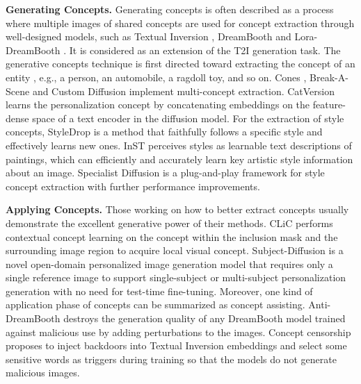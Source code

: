 \textbf{Generating Concepts.} Generating concepts is often described as a process where multiple images of shared concepts are used for concept extraction through well-designed models, such as Textual Inversion \cite{gal2022image}, DreamBooth \cite{Ruiz_2023_CVPR} and Lora-DreamBooth \cite{hu2022lora}. It is considered as an extension of the T2I generation task. The generative concepts technique is first directed toward extracting the concept of an entity \cite{10.1145/3618315}, e.g., a person, an automobile, a ragdoll toy, and so on. Cones \cite{liu2023cones, liu2023cones2}, Break-A-Scene \cite{Avrahami2023Break} and Custom Diffusion \cite{Kumari_2023_CVPR} implement multi-concept extraction. CatVersion \cite{zhao2023catversion} learns the personalization concept by concatenating embeddings on the feature-dense space of a text encoder in the diffusion model. For the extraction of style concepts, StyleDrop \cite{NEURIPS2023_d33b177b} is a method that faithfully follows a specific style and effectively learns new ones. InST \cite{Zhang_2023_CVPR} perceives styles as learnable text descriptions of paintings, which can efficiently and accurately learn key artistic style information about an image. Specialist Diffusion \cite{Lu_2023_CVPR} is a plug-and-play framework for style concept extraction with further performance improvements.

\textbf{Applying Concepts.} Those working on how to better extract concepts usually demonstrate the excellent generative power of their methods. CLiC \cite{safaee2023clic} performs contextual concept learning on the concept within the inclusion mask and the surrounding image region to acquire local visual concept. Subject-Diffusion \cite{ma2023subject} is a novel open-domain personalized image generation model that requires only a single reference image to support single-subject or multi-subject personalization generation with no need for test-time fine-tuning. Moreover, one kind of application phase of concepts can be summarized as concept assisting. Anti-DreamBooth \cite{Van_Le_2023_ICCV} destroys the generation quality of any DreamBooth model trained against malicious use by adding perturbations to the images. Concept censorship \cite{zhang2023backdooring} proposes to inject backdoors into Textual Inversion embeddings and select some sensitive words as triggers during training so that the models do not generate malicious images.
